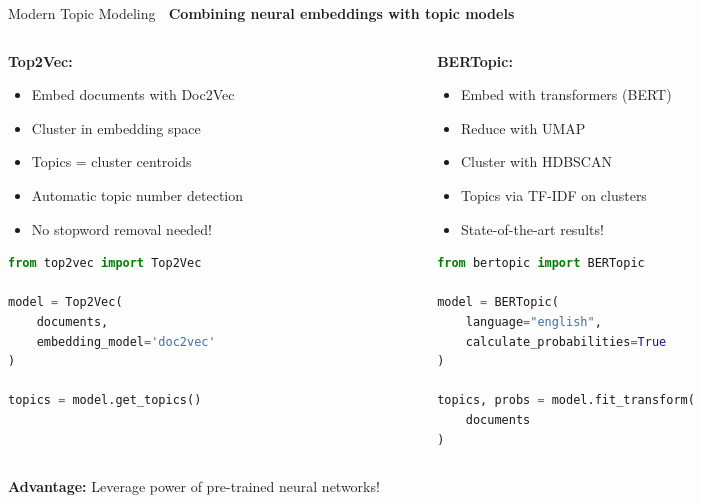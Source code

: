 \documentclass[aspectratio=169]{beamer}
\begin{document}
\begin{frame}[fragile,shrink=10]{Modern Topic Modeling 🎨}
\textbf{Combining neural embeddings with topic models}

\vspace{1em}

\begin{columns}[T]
\begin{column}{0.48\textwidth}
\textbf{Top2Vec:}
\begin{itemize}\setlength{\itemsep}{0pt}
    \item Embed documents with Doc2Vec
    \item Cluster in embedding space
    \item Topics = cluster centroids
    \item Automatic topic number detection
    \item No stopword removal needed!
\end{itemize}

\vspace{0.5em}
\begin{lstlisting}[language=Python]
from top2vec import Top2Vec

model = Top2Vec(
    documents,
    embedding_model='doc2vec'
)

topics = model.get_topics()
\end{lstlisting}
\end{column}

\begin{column}{0.48\textwidth}
\textbf{BERTopic:}
\begin{itemize}\setlength{\itemsep}{0pt}
    \item Embed with transformers (BERT)
    \item Reduce with UMAP
    \item Cluster with HDBSCAN
    \item Topics via TF-IDF on clusters
    \item State-of-the-art results!
\end{itemize}

\vspace{0.5em}
\begin{lstlisting}[language=Python]
from bertopic import BERTopic

model = BERTopic(
    language="english",
    calculate_probabilities=True
)

topics, probs = model.fit_transform(
    documents
)
\end{lstlisting}
\end{column}
\end{columns}

\vspace{0.5em}
\textbf{Advantage:} Leverage power of pre-trained neural networks!
\end{frame}
\end{document}

